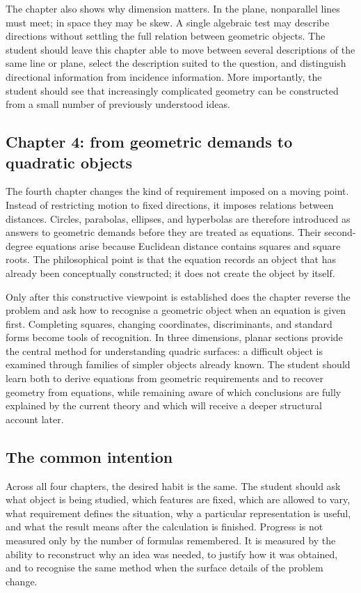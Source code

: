 The chapter also shows why dimension matters. In the plane, nonparallel lines must
meet; in space they may be skew. A single algebraic test may describe directions
without settling the full relation between geometric objects. The student should
leave this chapter able to move between several descriptions of the same line or
plane, select the description suited to the question, and distinguish directional
information from incidence information. More importantly, the student should see
that increasingly complicated geometry can be constructed from a small number of
previously understood ideas.

\subsection*{Chapter 4: from geometric demands to quadratic objects}

The fourth chapter changes the kind of requirement imposed on a moving point.
Instead of restricting motion to fixed directions, it imposes relations between
distances. Circles, parabolas, ellipses, and hyperbolas are therefore introduced as
answers to geometric demands before they are treated as equations. Their
second-degree equations arise because Euclidean distance contains squares and
square roots. The philosophical point is that the equation records an object that
has already been conceptually constructed; it does not create the object by
itself.

Only after this constructive viewpoint is established does the chapter reverse the
problem and ask how to recognise a geometric object when an equation is given
first. Completing squares, changing coordinates, discriminants, and standard forms
become tools of recognition. In three dimensions, planar sections provide the
central method for understanding quadric surfaces: a difficult object is examined
through families of simpler objects already known. The student should learn both
to derive equations from geometric requirements and to recover geometry from
equations, while remaining aware of which conclusions are fully explained by the
current theory and which will receive a deeper structural account later.

\subsection*{The common intention}

Across all four chapters, the desired habit is the same. The student should ask
what object is being studied, which features are fixed, which are allowed to vary,
what requirement defines the situation, why a particular representation is useful,
and what the result means after the calculation is finished. Progress is not
measured only by the number of formulas remembered. It is measured by the ability
to reconstruct why an idea was needed, to justify how it was obtained, and to
recognise the same method when the surface details of the problem change.

